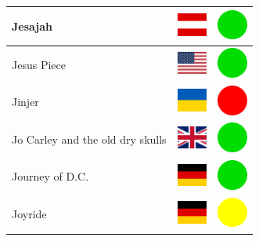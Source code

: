 \documentclass[12pt, a4paper, twoside]{report}
\begin{document}
\begin{center}
\begin{longtable}{|p{5cm}|p{2cm}|p{2cm}|}
 Jesajah                                                    & \includegraphics[width=1cm]{../img/flags/at} &   \includegraphics[width=1cm]{../likes/y} \\ \hline
 Jesus Piece                                                & \includegraphics[width=1cm]{../img/flags/us} &   \includegraphics[width=1cm]{../likes/y} \\ \hline
 Jinjer                                                     & \includegraphics[width=1cm]{../img/flags/ua} &   \includegraphics[width=1cm]{../likes/n} \\ \hline
 Jo Carley and the old dry skulls                           & \includegraphics[width=1cm]{../img/flags/gb} &   \includegraphics[width=1cm]{../likes/y} \\ \hline
 Journey of D.C.                                            & \includegraphics[width=1cm]{../img/flags/de} &   \includegraphics[width=1cm]{../likes/y} \\ \hline
 Joyride                                                    & \includegraphics[width=1cm]{../img/flags/de} &   \includegraphics[width=1cm]{../likes/m} \\ \hline

\end{longtable}
\end{center}
\end{document}
